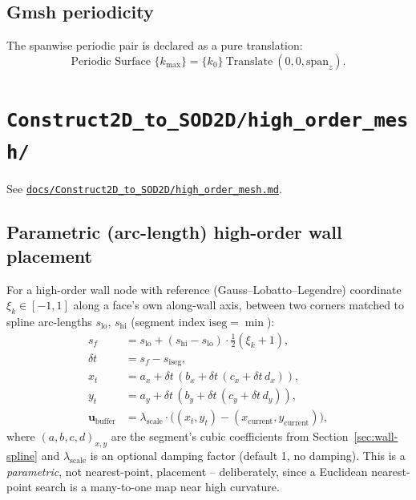\documentclass[11pt]{article}
\newcommand{\vecb}[1]{\bm{#1}}
\begin{document}
\subsection{Gmsh periodicity}
The spanwise periodic pair is declared as a pure translation:
\begin{equation}
\text{Periodic Surface } \{k_{\max}\} = \{k_0\}\ \text{Translate}\ (0,0,\text{span}_z).
\end{equation}

\section{\texttt{Construct2D\_to\_SOD2D/high\_order\_mesh/}}
\label{sec:c2s-high-order}
See \href{https://github.com/kvishalrai/AeroHexMesh/blob/master/docs/Construct2D_to_SOD2D/high_order_mesh.md}{\texttt{docs/Construct2D\_to\_SOD2D/high\_order\_mesh.md}}.

\subsection{Parametric (arc-length) high-order wall placement}
\label{sec:parametric-placement}
For a high-order wall node with reference (Gauss--Lobatto--Legendre)
coordinate \(\xi_k \in [-1,1]\) along a face's own along-wall axis,
between two corners matched to spline arc-lengths \(s_{\mathrm{lo}}\),
\(s_{\mathrm{hi}}\) (segment index \(\mathrm{iseg} = \min\)):
\begin{align}
s_f &= s_{\mathrm{lo}} + (s_{\mathrm{hi}} - s_{\mathrm{lo}})\cdot\tfrac{1}{2}(\xi_k + 1), \\
\delta t &= s_f - s_{\mathrm{iseg}}, \\
x_t &= a_x + \delta t\,(b_x + \delta t\,(c_x + \delta t\, d_x)), \\
y_t &= a_y + \delta t\,(b_y + \delta t\,(c_y + \delta t\, d_y)), \\
\vecb{u}_{\text{buffer}} &= \lambda_{\text{scale}} \cdot \big((x_t,y_t) - (x_{\text{current}}, y_{\text{current}})\big),
\end{align}
where \((a,b,c,d)_{x,y}\) are the segment's cubic coefficients from
Section~\ref{sec:wall-spline} and \(\lambda_{\text{scale}}\) is an optional
damping factor (default 1, no damping). This is a
\emph{parametric}, not nearest-point, placement -- deliberately, since
a Euclidean nearest-point search is a many-to-one map near high
curvature.
\end{document}
